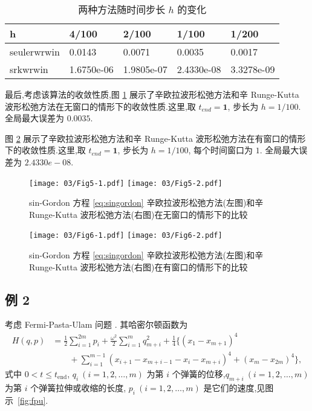 \begin{table}[h!]
    \begin{center}
    \caption{两种方法随时间步长 $h$ 的变化}
    \label{tbl:order}
    \begin{tabularx}{\linewidth}{XXXXX}
        \toprule
        h & 4/100 & 2/100 & 1/100 & 1/200\\
        \midrule
        seulerwrwin & 0.0143 &0.0071 &0.0035 &0.0017\\
        srkwrwin    & 1.6750e-06 & 1.9805e-07 & 2.4330e-08 & 3.3278e-09\\
        \bottomrule
    \end{tabularx}
    \end{center}
  \end{table}

最后,考虑该算法的收敛性质,图 \ref{fig:ex1err} 展示了辛欧拉波形松弛方法和辛 Runge-Kutta 波形松弛方法在无窗口的情形下的收敛性质.这里,取 $t_{end} =\textbf{1}$, 步长为 $h=1/100$. 全局最大误差为 $0.0035$.

图 \ref{fig:ex1winerr} 展示了辛欧拉波形松弛方法和辛 Runge-Kutta 波形松弛方法在有窗口的情形下的收敛性质.这里,取 $t_{end} =\textbf{1}$, 步长为 $h=1/100$, 每个时间窗口为 $1$. 全局最大误差为 $2.4330e-08$.

\begin{figure}[h!]
  \centering
  \texttt{[image: 03/Fig5-1.pdf]}
  \texttt{[image: 03/Fig5-2.pdf]}
  \caption{sin-Gordon 方程 \eqref{eq:singordon} 辛欧拉波形松弛方法(左图)和辛 Runge-Kutta 波形松弛方法(右图)在无窗口的情形下的比较}
  \label{fig:ex1err}
\end{figure}

\begin{figure}[h!]
  \centering
  \texttt{[image: 03/Fig6-1.pdf]}
  \texttt{[image: 03/Fig6-2.pdf]}
  \caption{sin-Gordon 方程 \eqref{eq:singordon} 辛欧拉波形松弛方法(左图)和辛 Runge-Kutta 波形松弛方法(右图)在有窗口的情形下的比较}
  \label{fig:ex1winerr}
\end{figure}

\subsection*{例 2}
考虑 Fermi-Pasta-Ulam 问题 \cite{hairer2006geometric}. 其哈密尔顿函数为
\begin{equation*}
  \begin{aligned}
    H(q,p) &= \displaystyle{\frac{1}{2}} \sum_{i=1}^{2m} p_i +
    \displaystyle{\frac{\omega^2}{2}} \sum_{i=1}^{m} q_{m+i}^2 +
    \displaystyle{\frac{1}{4}}  \{ (x_1 - x_{m+1})^4 \\
    & \qquad + \sum_{i=1}^{m-1} (x_{i+1} - x_{m+i-1} - x_i - x_{m+i})^4 + (x_{m}
    - x_{2m})^4\},
  \end{aligned}
\end{equation*}
式中 $0<t\leq t_{\text{end}}$, $q_i~(i=1,2,\ldots,m)$ 为第 $i$ 个弹簧的位移,$q_{m+i}~(i=1,2,\ldots,m)$ 为第 $i$ 个弹簧拉伸或收缩的长度, $p_i~(i=1,2,\ldots,m)$ 是它们的速度,见图示~\ref{fig:fpu}.

